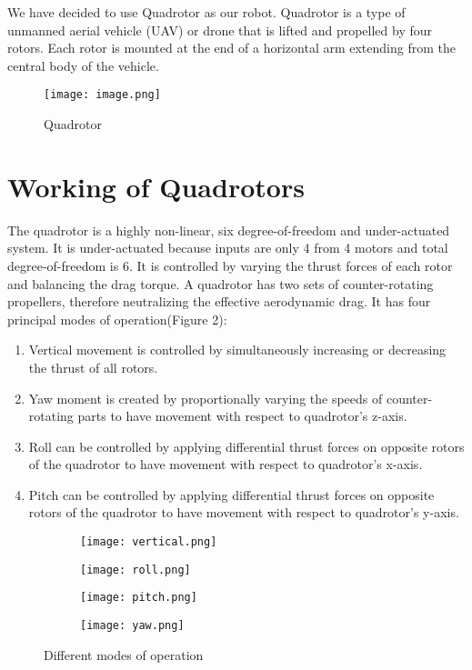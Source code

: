 
We have decided to use Quadrotor as our robot. Quadrotor is a type of unmanned aerial vehicle (UAV) or drone that is lifted and propelled by four rotors. Each rotor is mounted at the end of a horizontal arm extending from the central body of the vehicle. 

\begin{figure}[H]
\centering
\texttt{[image: image.png]}
\caption{\label{fig:Quadrotor}Quadrotor}
\end{figure}


\section{Working of Quadrotors}

The quadrotor is a highly non-linear, six degree-of-freedom and under-actuated system. It is under-actuated because inputs are only 4 from 4 motors and total degree-of-freedom is 6. It is controlled by varying the thrust forces of each rotor and balancing the drag torque. A quadrotor has two sets of counter-rotating propellers, therefore neutralizing the effective aerodynamic drag. It has four principal modes of operation(Figure 2): 
\begin{enumerate}
\item Vertical movement is controlled by simultaneously increasing or decreasing the thrust of all rotors.
\item Yaw moment is created by proportionally varying the speeds of counter-rotating parts to have movement with respect to quadrotor's z-axis.
\item Roll can be controlled by applying differential thrust forces on opposite rotors of the quadrotor to have movement with respect to quadrotor's x-axis.
\item Pitch can be controlled by applying differential thrust forces on opposite rotors of the quadrotor to have movement with respect to quadrotor's y-axis.
\end{enumerate}

\begin{figure}[H]
    \centering
    \begin{subfigure}{0.45\textwidth}
      \texttt{[image: vertical.png]}
      \label{fig:enter-label}
    \end{subfigure}
    \hfill
    \begin{subfigure}{0.45\textwidth}
      \texttt{[image: roll.png]}
      \label{fig:enter-label}
    \end{subfigure}

    \medskip

    \begin{subfigure}{0.45\textwidth}
        \texttt{[image: pitch.png]}
        \label{fig:enter-label}
    \end{subfigure}
    \hfill
    \begin{subfigure}{0.45\textwidth}
        \texttt{[image: yaw.png]}
        \label{fig:enter-label}
    \end{subfigure}
\caption{\label{fig:main}Different modes of operation}  
\end{figure}   
\\

